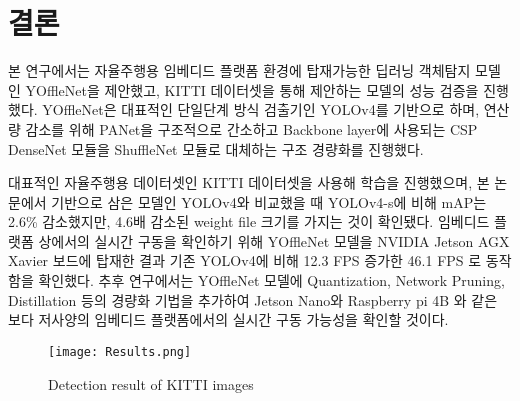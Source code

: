 \documentclass[10pt,twocolumn,letterpaper]{article}
\begin{document}
\vspace{.25cm}
\section{결론}
본 연구에서는 자율주행용 임베디드 플랫폼 환경에 탑재가능한 딥러닝 객체탐지 모델인 YOffleNet을 제안했고, KITTI 데이터셋을 통해 제안하는 모델의 성능 검증을 진행했다. YOffleNet은 대표적인 단일단계 방식 검출기인 YOLOv4를 기반으로 하며, 연산량 감소를 위해 PANet을 구조적으로 간소하고 Backbone layer에 사용되는 CSP DenseNet 모듈을 ShuffleNet 모듈로 대체하는 구조 경량화를 진행했다.

대표적인 자율주행용 데이터셋인 KITTI 데이터셋을 사용해 학습을 진행했으며, 본 논문에서 기반으로 삼은 모델인 YOLOv4와 비교했을 때 YOLOv4-s에 비해 mAP는 2.6\% 감소했지만, 4.6배 감소된 weight file 크기를 가지는 것이 확인됐다. 임베디드 플랫폼 상에서의 실시간 구동을 확인하기 위해 YOffleNet 모델을 NVIDIA Jetson AGX Xavier 보드에 탑재한 결과 기존 YOLOv4에 비해 12.3 FPS 증가한 46.1 FPS 로 동작함을 확인했다. 추후 연구에서는 YOffleNet 모델에 Quantization, Network Pruning, Distillation 등의 경량화 기법을 추가하여 Jetson Nano와 Raspberry pi 4B 와 같은 보다 저사양의 임베디드 플랫폼에서의 실시간 구동 가능성을 확인할 것이다.


\begin{figure*}[t]
    \captionsetup{singlelinecheck = false, format= hang, justification=raggedright, labelsep=space}
    \centering
        \texttt{[image: Results.png]}
    \caption{Detection result of KITTI images}
    \label{Results}
\end{figure*}



\pagebreak
{\small


}
\end{document}
